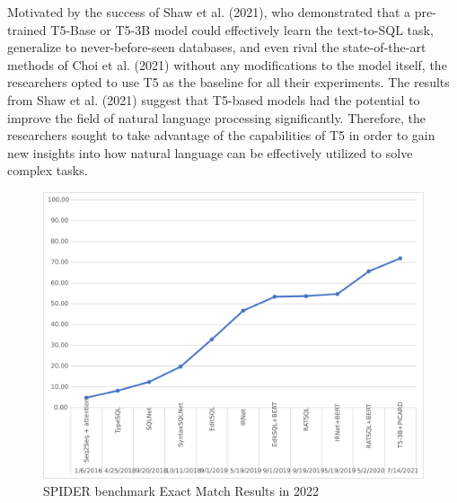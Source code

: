 Motivated by the success of Shaw et al. (2021)\cite{shaw-etal-2021-compositional}, who demonstrated that a pre-trained T5-Base or T5-3B model could effectively learn the text-to-SQL task, generalize to never-before-seen databases, and even rival the state-of-the-art methods of Choi et al. (2021)\cite{10.1162/coli_a_00403} without any modifications to the model itself, the researchers opted to use T5 as the baseline for all their experiments. The results from Shaw et al. (2021)\cite{shaw-etal-2021-compositional} suggest that T5-based models had the potential to improve the field of natural language processing significantly. Therefore, the researchers sought to take advantage of the capabilities of T5 in order to gain new insights into how natural language can be effectively utilized to solve complex tasks.


\begin{figure}[h]
    \centering
    \includegraphics[width=0.99\linewidth]{pics/picard/benchmarkeps}
    \caption{SPIDER benchmark Exact Match Results in 2022}
    \label{fig:benchmark}
\end{figure}
